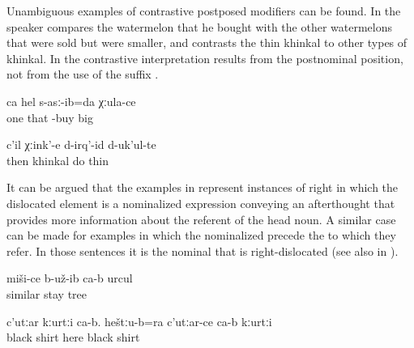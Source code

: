 Unambiguous examples of contrastive postposed modifiers can be found. In  the speaker compares the watermelon that he bought with the other watermelons that were sold but were smaller, and  contrasts the thin khinkal to other types of khinkal. In  the contrastive interpretation results from the postnominal position, not from the use of the suffix . 
%
\begin{exe}

	\ex	\label{ex:‎‎I took one, a big one}
	\gll	ca	hel	s-asː-ib=da	χːula-ce\\
		one	that	-buy	big\\
	\glt	{} 

		\ex	\label{ex:Then we make khinkal, the thin one}
		\gll	c'il	χːink'-e	d-irq'-id	d-uk'ul-te\\
			then	khinkal	do	thin\\
		\glt	{}
		
\end{exe}


It can be argued that the examples in  represent instances of right  in which the dislocated element is a nominalized expression conveying an afterthought that provides more information about the referent of the head noun. A similar case can be made for examples in which the nominalized  precede the  to which they refer. In those sentences it is the nominal that is right-dislocated  (see also  in ).
%
\begin{exe}
	\ex	\label{ex:There turned out to be a similar tree@20a}
	\gll	miši-ce	b-už-ib	ca-b	urcul\\
		similar	stay		tree\\
	\glt	{}

	\ex	\label{ex:This is a black shirt. And here this is also a black shirt@20b}
	\gll	c'utːar	kːurtːi	ca-b.	heštːu-b=ra	c'utːar-ce	ca-b	kːurtːi\\
		black	shirt		here	black		shirt\\
	\glt	{}
\end{exe}

